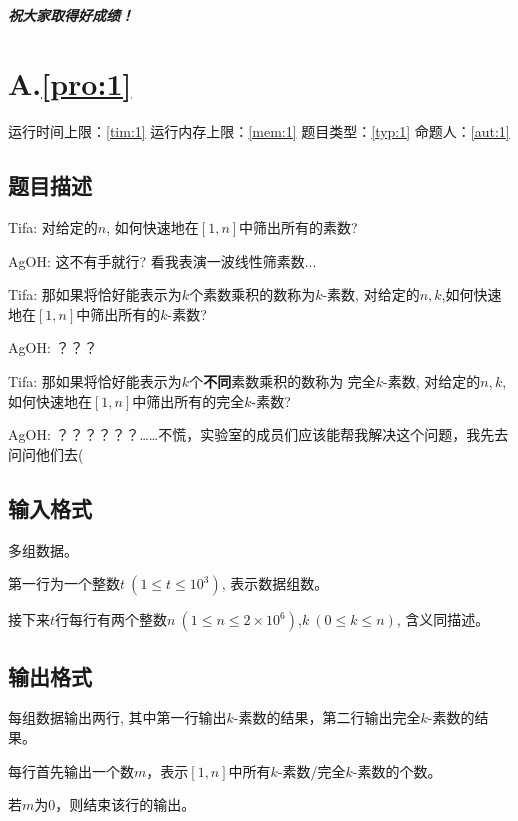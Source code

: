 \documentclass[
	lang=cn,
	color=green
]{elegantbook}
\begin{document}
\begin{titlepage}
	\paragraph*{祝大家取得好成绩！}

\end{titlepage}

\chapter*{A.\quad \ref*{pro:1}}
\begin{center}
	运行时间上限：\ref*{tim:1} \quad 运行内存上限：\ref*{mem:1} \quad 题目类型：\ref*{typ:1} \quad 命题人：\ref*{aut:1}
\end{center}

\section*{题目描述}
Tifa: 对给定的$n$, 如何快速地在$[1,n]$中筛出所有的素数?

AgOH: 这不有手就行? 看我表演一波线性筛素数...

Tifa: 那如果将恰好能表示为$k$个素数乘积的数称为$k$-素数, 对给定的$n,k$,如何快速地在$[1,n]$中筛出所有的$k$-素数?

AgOH: ？？？

Tifa: 那如果将恰好能表示为$k$个\textbf{不同}素数乘积的数称为 完全$k$-素数, 对给定的$n,k$,如何快速地在$[1,n]$中筛出所有的完全$k$-素数?

AgOH: ？？？？？？……不慌，实验室的成员们应该能帮我解决这个问题，我先去问问他们去(

\section*{输入格式}
多组数据。

第一行为一个整数$t~(1\leq t\leq 10^3)$, 表示数据组数。

接下来$t$行每行有两个整数$n~(1\leq n\leq 2\times 10^6)$,$k~(0\leq k\leq n)$, 含义同描述。


\section*{输出格式}
每组数据输出两行, 其中第一行输出$k$-素数的结果，第二行输出完全$k$-素数的结果。

每行首先输出一个数$m$，表示$[1,n]$中所有$k$-素数/完全$k$-素数的个数。

若$m$为$0$，则结束该行的输出。
\end{document}
